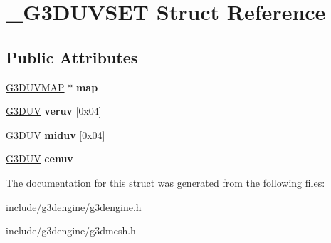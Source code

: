 \hypertarget{struct__G3DUVSET}{}\section{\+\_\+\+G3\+D\+U\+V\+S\+ET Struct Reference}
\label{struct__G3DUVSET}
\subsection*{Public Attributes}
\begin{DoxyCompactItemize}
\item 
\mbox{\label{struct__G3DUVSET_ad8a8e874aa00baf43b5783d661f44671}} 
\hyperlink{struct__G3DUVMAP}{G3\+D\+U\+V\+M\+AP} $\ast$ {\bfseries map}
\item 
\mbox{\label{struct__G3DUVSET_a6aa2a871fc8186026cacd07b1f82f770}} 
\hyperlink{struct__G3DUV}{G3\+D\+UV} {\bfseries veruv} \mbox{[}0x04\mbox{]}
\item 
\mbox{\label{struct__G3DUVSET_aece9fff3031e4f4eeec0b23a4687a8f8}} 
\hyperlink{struct__G3DUV}{G3\+D\+UV} {\bfseries miduv} \mbox{[}0x04\mbox{]}
\item 
\mbox{\label{struct__G3DUVSET_a07df7df88f04dbe17dfb7ebacbefe98f}} 
\hyperlink{struct__G3DUV}{G3\+D\+UV} {\bfseries cenuv}
\end{DoxyCompactItemize}


The documentation for this struct was generated from the following files\+:\begin{DoxyCompactItemize}
\item 
include/g3dengine/g3dengine.\+h\item 
include/g3dengine/g3dmesh.\+h\end{DoxyCompactItemize}
